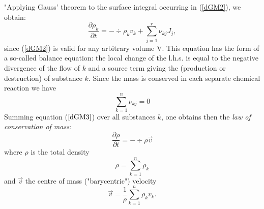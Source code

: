 "Applying Gauss' theorem to the surface integral occurring in (\ref{dGM2}), we obtain:
\begin{equation}
\frac{\partial \rho_k}{\partial t} = - \div \rho_k v_k + \sum_{j=1}^r \nu_{kj} J_j,
\label{dGM3}
\end{equation}
since (\ref{dGM2}) is valid for any arbitrary volume V. This equation has the form of a so-called balance equation: the local change of the l.h.s. is equal to the negative divergence of the flow of $k$ and a source term giving the (production or destruction) of substance $k$.
Since the mass is conserved in each separate chemical reaction we have
\begin{equation}
\sum_{k=1}^n \nu_{kj}= 0 
\end{equation}
Summing equation ($\ref{dGM3}$) over all substances $k$, one obtains then the {\it law of conservation of mass}:
\begin{equation}
\frac{\partial \rho}{\partial t} = - \div \rho \vec{v}
\label{dGM5}
\end{equation}
where $\rho$ is the total density
\begin{equation}
\rho = \sum_{k=1}^n \rho_k
\end{equation}
and $\vec{v}$ the centre of mass ("barycentric") velocity
\begin{equation}
\vec{v} = \frac{1}{\rho} \sum_{k=1}^n \rho_k v_k.
\end{equation}
